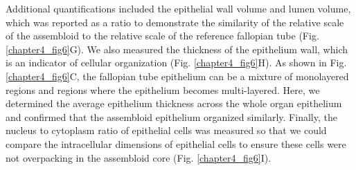 \begin{refsection}
    Additional quantifications included the epithelial wall volume and lumen volume, which was reported as a ratio to demonstrate the similarity of the relative scale of the assembloid to the relative scale of the reference fallopian tube (Fig. \ref{chapter4_fig6}G). We also measured the thickness of the epithelium wall, which is an indicator of cellular organization (Fig. \ref{chapter4_fig6}H). As shown in Fig. \ref{chapter4_fig6}C, the fallopian tube epithelium can be a mixture of monolayered regions and regions where the epithelium becomes multi-layered. Here, we determined the average epithelium thickness across the whole organ epithelium and confirmed that the assembloid epithelium organized similarly. Finally, the nucleus to cytoplasm ratio of epithelial cells was measured so that we could compare the intracellular dimensions of epithelial cells to ensure these cells were not overpacking in the assembloid core (Fig. \ref{chapter4_fig6}I).

\end{refsection}
